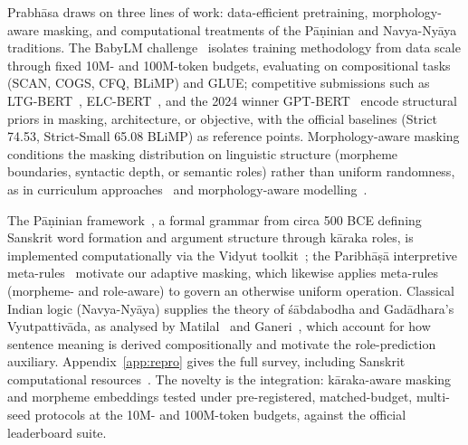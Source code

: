 Prabhāsa draws on three lines of work: data-efficient pretraining, morphology-aware masking, and computational treatments of the Pāṇinian and Navya-Nyāya traditions. The BabyLM challenge~\cite{Warstadt2023, Hu2024BabyLM} isolates training methodology from data scale through fixed 10M- and 100M-token budgets, evaluating on compositional tasks (SCAN, COGS, CFQ, BLiMP) and GLUE; competitive submissions such as LTG-BERT~\cite{Samuel2023LTG}, ELC-BERT~\cite{CharpentierSamuel2023}, and the 2024 winner GPT-BERT~\cite{CharpentierSamuel2024} encode structural priors in masking, architecture, or objective, with the official baselines (Strict 74.53, Strict-Small 65.08 BLiMP) as reference points. Morphology-aware masking conditions the masking distribution on linguistic structure (morpheme boundaries, syntactic depth, or semantic roles) rather than uniform randomness, as in curriculum approaches~\cite{Xu2020Curriculum} and morphology-aware modelling~\cite{Belinkov2017Morphology, Botha2014Morphology}.

The Pāṇinian framework~\cite{KiparskyStaal1969, Cardona1974Karaka}, a formal grammar from circa 500 BCE defining Sanskrit word formation and argument structure through kāraka roles, is implemented computationally via the Vidyut toolkit~\cite{Prasad2024Vidyut}; the Paribhāṣā interpretive meta-rules~\cite{Kielhorn1868Paribhasa} motivate our adaptive masking, which likewise applies meta-rules (morpheme- and role-aware) to govern an otherwise uniform operation. Classical Indian logic (Navya-Nyāya) supplies the theory of śābdabodha and Gadādhara's Vyutpattivāda, as analysed by Matilal~\cite{Matilal1990WordWorld} and Ganeri~\cite{Ganeri1999SemanticPowers}, which account for how sentence meaning is derived compositionally and motivate the role-prediction auxiliary. Appendix~\ref{app:repro} gives the full survey, including Sanskrit computational resources~\cite{Kulkarni2010Parser, Huet2003SanskritHeritage}. The novelty is the integration: kāraka-aware masking and morpheme embeddings tested under pre-registered, matched-budget, multi-seed protocols at the 10M- and 100M-token budgets, against the official leaderboard suite.
